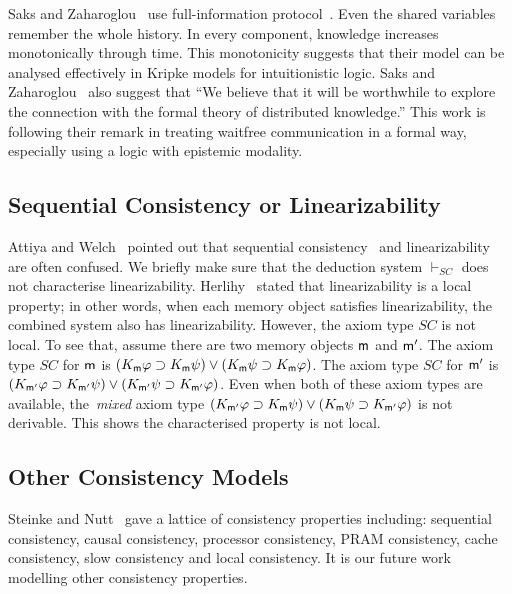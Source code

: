 \documentclass[doctor]{iscs-thesis}
\newcommand{\memory}{{\sf m}}
\begin{document}
Saks and Zaharoglou~\cite{saks2000wait} use full-information protocol~\cite{182113}.
Even the shared variables remember the whole history.
In every component, knowledge increases monotonically through time.
This monotonicity suggests that their model can be analysed effectively in Kripke models
for intuitionistic logic.
Saks and Zaharoglou~\cite{saks2000wait} also suggest that 
``We believe that it will be worthwhile to explore the
connection with the formal theory of distributed
knowledge.'' This work is following their remark in treating waitfree communication in a
formal way, especially using a logic with epistemic modality.

\subsection{Sequential Consistency or Linearizability}

Attiya and Welch~\cite{attiya1994sequential} pointed out that 
sequential consistency~\cite{lamport1979make} and
linearizability~\cite{herlihy1990linearizability} are often confused.
We briefly make sure that the deduction system $\vdash_{SC}$ does
not characterise linearizability.
Herlihy~\cite{herlihy1990linearizability} stated that
linearizability is a local
property; in other words,
when each memory object satisfies linearizability, the combined system also has linearizability.
However, the axiom type $SC$ is not local.
To see that, assume there are two memory objects $\memory$ and $\memory'$.
The axiom type $SC$ for $\memory$ is $(K_\memory \varphi\supset K_\memory
\psi)\vee (K_\memory \psi\supset K_\memory\varphi)$.
The axiom type $SC$ for $\memory'$ is $(K_{\memory'} \varphi\supset K_{\memory'}
\psi)\vee (K_{\memory'} \psi\supset K_{\memory'}\varphi)$.
Even when both of these axiom types are available,
the~\textit{mixed} axiom type $(K_{\memory'} \varphi\supset K_{\memory}
\psi)\vee (K_{\memory} \psi\supset K_{\memory'}\varphi)$ is not derivable. This shows
the characterised property is not local.

\subsection{Other Consistency Models}

Steinke and Nutt~\cite{steinke2004unified} gave a lattice of consistency properties
including: sequential consistency, causal consistency, processor consistency, PRAM
consistency, cache consistency, slow consistency and local consistency.
It is our future work modelling other consistency properties.
\end{document}

